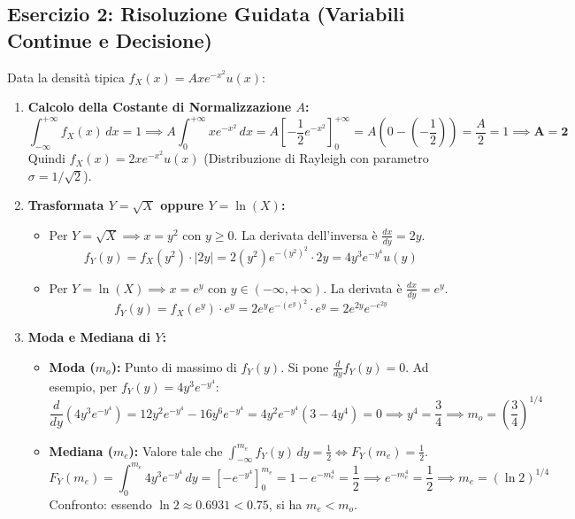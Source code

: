 \documentclass[a4paper, 10pt]{article}
\begin{document}
\subsection{Esercizio 2: Risoluzione Guidata (Variabili Continue e Decisione)}
Data la densità tipica $f_X(x) = A x e^{-x^2} u(x)$:
\begin{enumerate}
    \item \textbf{Calcolo della Costante di Normalizzazione $A$:}
    \[ \int_{-\infty}^{+\infty} f_X(x)\,dx = 1 \implies A \int_0^{+\infty} x e^{-x^2}\,dx = A \left[ -\frac{1}{2} e^{-x^2} \right]_0^{+\infty} = A \left( 0 - \left(-\frac{1}{2}\right) \right) = \frac{A}{2} = 1 \implies \mathbf{A = 2} \]
    Quindi $f_X(x) = 2x e^{-x^2} u(x)$ (Distribuzione di Rayleigh con parametro $\sigma = 1/\sqrt{2}$).
    
    \item \textbf{Trasformata $Y = \sqrt{X}$ oppure $Y = \ln(X)$:}
    \begin{itemize}
        \item Per $Y = \sqrt{X} \implies x = y^2$ con $y \ge 0$. La derivata dell'inversa è $\frac{dx}{dy} = 2y$.
        \[ f_Y(y) = f_X(y^2) \cdot |2y| = 2(y^2) e^{-(y^2)^2} \cdot 2y = 4 y^3 e^{-y^4} u(y) \]
        \item Per $Y = \ln(X) \implies x = e^y$ con $y \in (-\infty, +\infty)$. La derivata è $\frac{dx}{dy} = e^y$.
        \[ f_Y(y) = f_X(e^y) \cdot e^y = 2e^y e^{-(e^y)^2} \cdot e^y = 2e^{2y} e^{-e^{2y}} \]
    \end{itemize}

    \item \textbf{Moda e Mediana di $Y$:}
    \begin{itemize}
        \item \textbf{Moda ($m_o$):} Punto di massimo di $f_Y(y)$. Si pone $\frac{d}{dy} f_Y(y) = 0$.
        Ad esempio, per $f_Y(y) = 4y^3 e^{-y^4}$:
        \[ \frac{d}{dy}(4y^3 e^{-y^4}) = 12y^2 e^{-y^4} - 16y^6 e^{-y^4} = 4y^2 e^{-y^4}(3 - 4y^4) = 0 \implies y^4 = \frac{3}{4} \implies m_o = \left(\frac{3}{4}\right)^{1/4} \]
        \item \textbf{Mediana ($m_e$):} Valore tale che $\int_{-\infty}^{m_e} f_Y(y)\,dy = \frac{1}{2} \iff F_Y(m_e) = \frac{1}{2}$.
        \[ F_Y(m_e) = \int_0^{m_e} 4y^3 e^{-y^4}\,dy = \left[ -e^{-y^4} \right]_0^{m_e} = 1 - e^{-m_e^4} = \frac{1}{2} \implies e^{-m_e^4} = \frac{1}{2} \implies m_e = (\ln 2)^{1/4} \]
        Confronto: essendo $\ln 2 \approx 0.6931 < 0.75$, si ha $m_e < m_o$.
    \end{itemize}


\end{enumerate}
\end{document}

